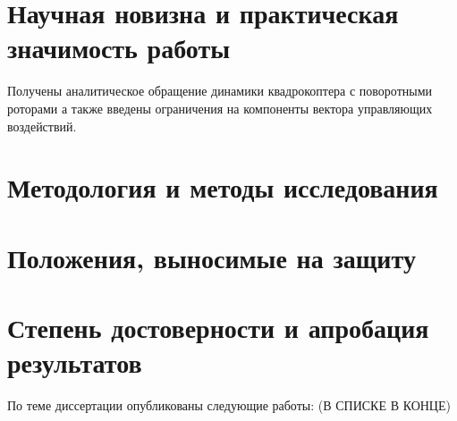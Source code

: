 \section{Научная новизна и практическая значимость работы}
Получены аналитическое обращение динамики квадрокоптера с поворотными роторами а также введены ограничения на компоненты вектора управляющих воздействий.

\section{Методология и методы исследования}

\section{Положения, выносимые на защиту}

\section{Степень достоверности и апробация результатов}
По теме диссертации опубликованы следующие работы: (В СПИСКЕ В КОНЦЕ)

